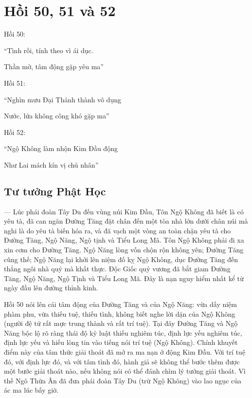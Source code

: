 \chapter{Hồi 50, 51 và 52} %
\label{cha:hoi_50_51}

Hồi 50:

\begin{itshape}
``Tình rối, tính theo vì ái dục.

Thần mờ, tâm động gặp yêu ma''
\end{itshape}

Hồi 51:

\begin{itshape}
``Nghìn mưu Đại Thánh thành vô dụng

Nước, lửa không công khó gặp ma''
\end{itshape}

Hồi 52:

\begin{itshape}
``Ngộ Không làm nhộn Kim Đầu động

Như Lai mách kín vị chủ nhân''
\end{itshape}

\section{Tư tưởng Phật Học} %
\label{sec:50_51_phat_hoc}

— Lúc phái đoàn Tây Du đến vùng núi Kim Đầu, Tôn Ngộ Không đã biết là có yêu tà, đã can ngăn Đường Tăng đặt chân đến một tòa nhà lớn dưới chân núi mà nghi là do yêu tà biến hóa ra, và đã vạch một vòng an toàn chặn yêu tà cho Đường Tăng, Ngộ Năng, Ngộ tịnh và Tiểu Long Mã. Tôn Ngộ Không phải đi xa xin cơm cho Đường Tăng. Ngộ Năng lòng vốn chộn rộn không yên; Đường Tăng cũng thế; Ngộ Năng lại khởi lên niệm đố kỵ Ngộ Không, dục Đường Tăng đến thẳng ngôi nhà quỷ mà khất thực. Độc Giốc quỷ vương đã bắt giam Đường Tăng, Ngộ Năng, Ngộ Tịnh và Tiểu Long Mã. Đây là nạn nguy hiểm nhất kể từ ngày đầu lên đường thỉnh kinh.

Hồi 50 nói lên cái tâm động của Đường Tăng và của Ngộ Năng: vừa dấy niệm phàm phu, vừa thiếu tuệ, thiếu tình, không biết nghe lời dặn của Ngộ Không (người đệ tử rất mực trung thành và rất trí tuệ). Tại đây Đường Tăng và Ngộ Năng bộc lộ rõ ràng thái độ kỷ luật thiếu nghiêm túc, định lực yếu nghiêm túc, định lực yếu và hiếu lòng tin vào tiếng nói trí tuệ (Ngộ Không). Chính khuyết điểm này của tâm thức giải thoát đã mở ra ma nạn ở động Kim Đầu. Với trí tuệ đó, với định lực đó, và với tâm tình đó, hành giả sẽ không thể bước thêm được một bước giải thoát nào, nếu không nói có thể đánh chìm lý tưởng giải thoát. Vì thế Ngô Thừa Ân đã đưa phái đoàn Tây Du (trừ Ngộ Không) vào lao ngục của ác ma lúc bấy giờ.

